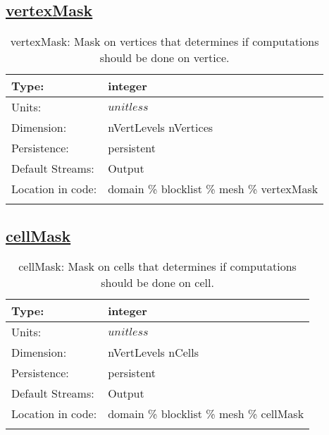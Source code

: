 \subsection[vertexMask]{\hyperref[sec:var_tab_mesh]{vertexMask}}
\label{subsec:var_sec_mesh_vertexMask}
\begin{center}
\begin{longtable}{| p{2.0in} | p{4.0in} |}
        \hline 
        Type: & integer \\
        \hline 
        Units: & $unitless$ \\
        \hline 
        Dimension: & nVertLevels nVertices \\
        \hline 
        Persistence: & persistent \\
        \hline 
		 Default Streams: & Output  \\
        \hline 
		 Location in code: & domain \% blocklist \% mesh \% vertexMask \\
		 \hline 
    \caption{vertexMask: Mask on vertices that determines if computations should be done on vertice.}
\end{longtable}
\end{center}
\subsection[cellMask]{\hyperref[sec:var_tab_mesh]{cellMask}}
\label{subsec:var_sec_mesh_cellMask}
\begin{center}
\begin{longtable}{| p{2.0in} | p{4.0in} |}
        \hline 
        Type: & integer \\
        \hline 
        Units: & $unitless$ \\
        \hline 
        Dimension: & nVertLevels nCells \\
        \hline 
        Persistence: & persistent \\
        \hline 
		 Default Streams: & Output  \\
        \hline 
		 Location in code: & domain \% blocklist \% mesh \% cellMask \\
		 \hline 
    \caption{cellMask: Mask on cells that determines if computations should be done on cell.}
\end{longtable}
\end{center}
